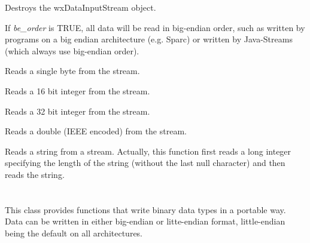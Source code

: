 
Destroys the wxDataInputStream object.



If {\it be_order} is TRUE, all data will be read in big-endian
order, such as written by programs on a big endian architecture 
(e.g. Sparc) or written by Java-Streams (which always use 
big-endian order).
  


Reads a single byte from the stream.



Reads a 16 bit integer from the stream.



Reads a 32 bit integer from the stream.



Reads a double (IEEE encoded) from the stream.



Reads a string from a stream. Actually, this function first reads a long integer
specifying the length of the string (without the last null character) and then
reads the string.


\section{}\label{wxdataoutputstream}

This class provides functions that write binary data types in a
portable way. Data can be written in either big-endian or litte-endian
format, little-endian being the default on all architectures.


